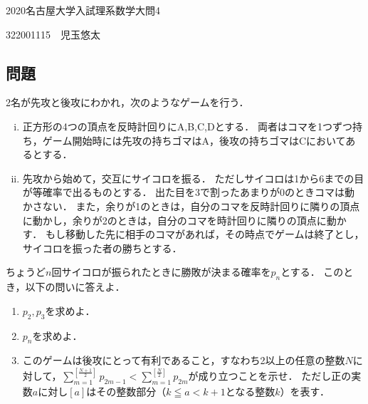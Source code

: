 \documentclass[../main]{subfiles}
\begin{document}
\begin{center}
	{\large 2020名古屋大学入試理系数学大問4}
\end{center}
\begin{flushright}
  322001115~~児玉悠太
\end{flushright}
\subsection*{問題}
2名が先攻と後攻にわかれ，次のようなゲームを行う．
\begin{enumerate}[(i)]
	\item 正方形の4つの頂点を反時計回りにA,B,C,Dとする．
				両者はコマを1つずつ持ち，ゲーム開始時には先攻の持ちゴマはA，後攻の持ちゴマはCにおいてあるとする．
	\item 先攻から始めて，交互にサイコロを振る．
				ただしサイコロは1から6までの目が等確率で出るものとする．
				出た目を3で割ったあまりが0のときコマは動かさない．
				また，余りが1のときは，自分のコマを反時計回りに隣りの頂点に動かし，余りが2のときは，自分のコマを時計回りに隣りの頂点に動かす．
				もし移動した先に相手のコマがあれば，その時点でゲームは終了とし，サイコロを振った者の勝ちとする．
\end{enumerate}
ちょうど$n$回サイコロが振られたときに勝敗が決まる確率を$p_n$とする．
このとき，以下の問いに答えよ．
\begin{enumerate}[(1)]
	\item $p_2,p_3$を求めよ．
	\item $p_n$を求めよ．
	\item このゲームは後攻にとって有利であること，すなわち2以上の任意の整数$N$に対して，$\displaystyle \sum_{m=1}^{[\frac{N+1}{2}]}p_{2m-1}<\sum_{m=1}^{[\frac{N}{2}]}p_{2m}$が成り立つことを示せ．
				ただし正の実数$a$に対し$[a]$はその整数部分（$k\leqq a<k+1$となる整数$k$）を表す．
\end{enumerate}
\end{document}
